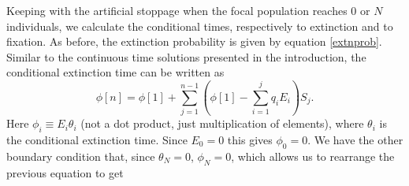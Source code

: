 Keeping with the artificial stoppage when the focal population reaches $0$ or $N$ individuals, we calculate the conditional times, respectively to extinction and to fixation. 
As before, the extinction probability is given by equation \ref{extnprob}. 
Similar to the continuous time solutions presented in the introduction, %
the conditional extinction time can be written as \cite{Iyer-Biswas2015}
\begin{equation}
\phi[n] = \phi[1] + \sum_{j=1}^{n-1}\left(\phi[1] - \sum_{i=1}^{j}q_iE_i\right)S_{j}.  
\end{equation}
Here $\phi_i \equiv E_i \theta_i$ (not a dot product, just multiplication of elements), where $\theta_i$ is the conditional extinction time. 
Since $E_0=0$ this gives $\phi_0=0$. 
We have the other boundary condition that, since $\theta_N = 0$, $\phi_N = 0$, which allows us to rearrange the previous equation to get
